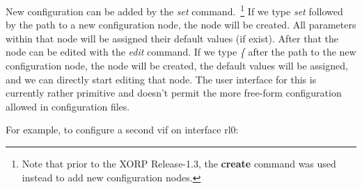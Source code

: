 New configuration can be added by the \emph{set} command.~\footnote{Note that
prior to the XORP Release-1.3, the \textbf{create} command was used instead to
add new configuration nodes.}
If we type \emph{set} followed by the path to a new configuration node,
the node will be created. All parameters within that node will be assigned
their default values (if exist). After that the node can be edited with the
\emph{edit} command.
If we type \emph{\{} after the path to the new configuration node,
the node will be created, the default values will be assigned, and we can
directly start editing that node.
The user interface for this is currently rather
primitive and doesn't permit the more free-form configuration allowed
in configuration files.

\newpage
For example, to configure a second vif on interface rl0:
\vspace{0.1in}

